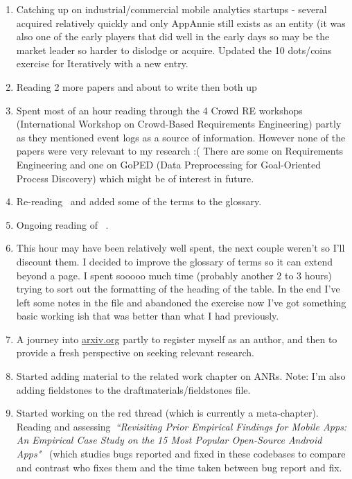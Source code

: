 \begin{enumerate}
    \item Catching up on industrial/commercial mobile analytics startups - several acquired relatively quickly and only AppAnnie still exists as an entity (it was also one of the early players that did well in the early days so may be the market leader so harder to dislodge or acquire. Updated the 10 dots/coins exercise for Iteratively with a new entry.
    \item Reading 2 more papers and about to write then both up~\citep{linares2015_mining_android_app_execution_traces_etc, martin2017_survey_in_app_store_analysis_for_software_engineering_IEEE_edition}
    \item Spent most of an hour reading through the 4 Crowd RE workshops (International Workshop on Crowd-Based Requirements Engineering) partly as they mentioned event logs as a source of information. However none of the papers were very relevant to my research :( There are some on Requirements Engineering and one on GoPED (Data Preprocessing for Goal-Oriented Process Discovery) which might be of interest in future.
    \item Re-reading~\citep{maalej2016_towards_data_driven_requirements_engineering} and added some of the terms to the glossary.
    \item Ongoing reading of ~\citep{maalej2016_towards_data_driven_requirements_engineering}.
    \item This hour may have been relatively well spent, the next couple weren't so I'll discount them. I decided to improve the glossary of terms so it can extend beyond a page. I spent sooooo much time (probably another 2 to 3 hours) trying to sort out the formatting of the heading of the table. In the end I've left some notes in the file and abandoned the exercise now I've got something basic working ish that was better than what I had previously. 
    \item A journey into \url{arxiv.org} partly to register myself as an author, and then to provide a fresh perspective on seeking relevant research.
    \item Started adding material to the related work chapter on ANRs. Note: I'm also adding fieldstones to the draftmaterials/fieldstones file.
    \item Started working on the red thread (which is currently a meta-chapter). Reading and assessing~\emph{``Revisiting Prior Empirical Findings for Mobile Apps: An Empirical Case Study on the 15 Most Popular Open-Source Android Apps"}~\citep{syer2013_empirical_findings_for_mobile_apps} (which studies bugs reported and fixed in these codebases to compare and contrast who fixes them and the time taken between bug report and fix.

\end{enumerate}

